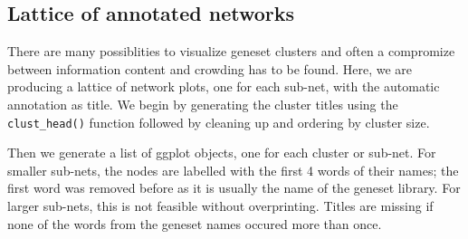 \documentclass[9pt,a4paper,]{extarticle}
\newenvironment{Shaded}{\begin{snugshade}}{\end{snugshade}}
\newcommand{\KeywordTok}[1]{\textcolor[rgb]{0.13,0.29,0.53}{\textbf{#1}}}
\newcommand{\DataTypeTok}[1]{\textcolor[rgb]{0.13,0.29,0.53}{#1}}
\newcommand{\StringTok}[1]{\textcolor[rgb]{0.31,0.60,0.02}{#1}}
\newcommand{\CommentTok}[1]{\textcolor[rgb]{0.56,0.35,0.01}{\textit{#1}}}
\newcommand{\OperatorTok}[1]{\textcolor[rgb]{0.81,0.36,0.00}{\textbf{#1}}}
\newcommand{\NormalTok}[1]{#1}
\theoremstyle{definition}
\theoremstyle{definition}
\theoremstyle{definition}
\theoremstyle{remark}
\begin{document}
\subsection{Lattice of annotated networks}\label{lattice-of-annotated-networks}

There are many possiblities to visualize geneset clusters and often a compromize between information content and crowding has to be found. Here, we are producing a lattice of network plots, one for each sub-net, with the automatic annotation as title. We begin by generating the cluster titles using the \texttt{clust\_head()} function followed by cleaning up and ordering by cluster size.

\begin{Shaded}
\end{Shaded}

Then we generate a list of ggplot objects, one for each cluster or sub-net. For smaller sub-nets, the nodes are labelled with the first 4 words of their names; the first word was removed before as it is usually the name of the geneset library. For larger sub-nets, this is not feasible without overprinting. Titles are missing if none of the words from the geneset names occured more than once.
\end{document}
